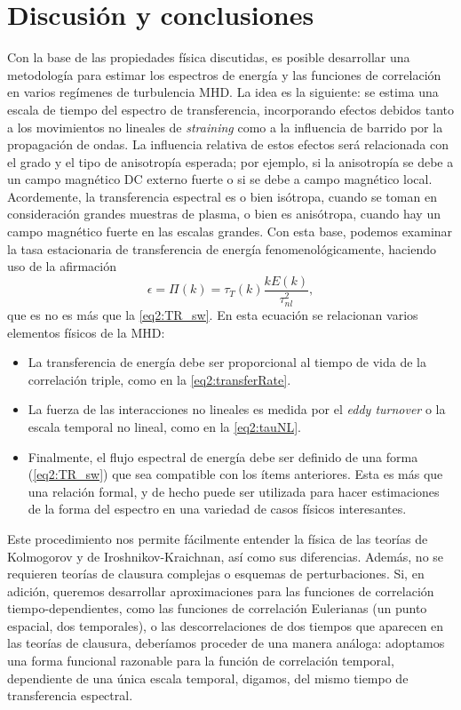 \section{Discusión y conclusiones}\label{sec:FundConclusiones}

Con la base de las propiedades física discutidas, es posible
desarrollar una metodología para estimar los espectros de energía y
las funciones de correlación en varios regímenes de turbulencia
MHD. La idea es la siguiente: se estima una escala de tiempo del
espectro de transferencia, incorporando efectos debidos tanto a los
movimientos no lineales de \textit{straining} como a la influencia
de barrido por la propagación de ondas. La influencia
relativa de estos efectos será relacionada con el grado y el tipo de
anisotropía esperada; por ejemplo, si la anisotropía se debe a un
campo magnético DC externo fuerte o si se debe a campo magnético
local. Acordemente, la transferencia espectral es o bien isótropa,
cuando se toman en consideración grandes muestras de plasma, o bien es
anisótropa, cuando hay un campo magnético fuerte en las escalas
grandes. Con esta base, podemos examinar la tasa estacionaria de
transferencia de energía fenomenológicamente, haciendo uso de la
afirmación
\begin{equation}
  \epsilon = \Pi(k) = \tau_T(k) \frac{kE(k)}{\tau_{nl}^2},
\end{equation}
que es no es más que la \cref{eq2:TR_sw}. En esta ecuación se
relacionan varios elementos físicos de la MHD:
\begin{itemize}
\item La transferencia de energía debe ser proporcional al tiempo de
  vida de la correlación triple, como en la \cref{eq2:transferRate}.
\item La fuerza de las interacciones no lineales es medida por el
  \textit{eddy turnover} o la escala temporal no lineal, como en
  la \cref{eq2:tauNL}.
\item Finalmente, el flujo espectral de energía debe ser definido de
  una forma (\cref{eq2:TR_sw}) que sea compatible con los ítems
  anteriores. Esta es más que una relación formal, y de hecho puede
  ser utilizada para hacer estimaciones de la forma del espectro en
  una variedad de casos físicos interesantes.
\end{itemize}

Este procedimiento nos permite fácilmente entender la física de las
teorías de Kolmogorov y de Iroshnikov-Kraichnan, así como sus
diferencias. Además, no se requieren teorías de clausura complejas o
esquemas de perturbaciones. Si, en adición, queremos desarrollar
aproximaciones para las funciones de correlación tiempo-dependientes,
como las funciones de correlación Eulerianas (un punto espacial, dos
temporales), o las descorrelaciones de dos tiempos que aparecen en las
teorías de clausura, deberíamos proceder de una manera análoga:
adoptamos una forma funcional razonable para la función de correlación
temporal, dependiente de una única escala temporal, digamos,
del mismo tiempo de transferencia espectral.


